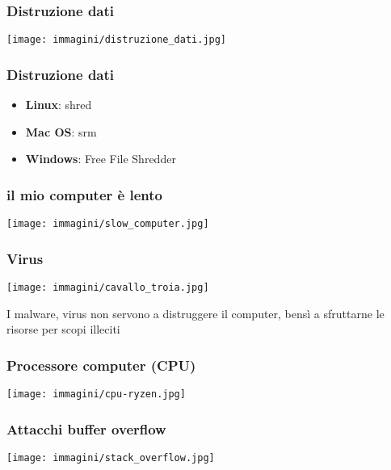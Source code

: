 \documentclass[italian,aspectratio=169]{beamer}
\begin{document}
\begin{frame}
 \frametitle{Distruzione dati}
   \vspace{-0.2cm}
    \begin{center}
     \texttt{[image: immagini/distruzione\_dati.jpg]}
    \end{center}
\end{frame}

\begin{frame}
 \frametitle{Distruzione dati}
 \begin{itemize}
  \item \textbf{Linux}: shred
  \item \textbf{Mac OS}: srm
  \item \textbf{Windows}: Free File Shredder
 \end{itemize}
\end{frame}

\begin{frame}
 \frametitle{il mio computer è lento}
 \begin{center}
   \texttt{[image: immagini/slow\_computer.jpg]}
  \end{center}
\end{frame}

\begin{frame}
 \frametitle{Virus}
  \begin{center}
   \texttt{[image: immagini/cavallo\_troia.jpg]}
  \end{center}
 
 I malware, virus non servono a distruggere il computer, bensì a sfruttarne le  risorse per scopi illeciti
\end{frame}


\begin{frame}
 \frametitle{Processore computer (CPU)}
 \begin{center}
   \texttt{[image: immagini/cpu-ryzen.jpg]}
  \end{center}
\end{frame}

{
\begin{frame}[plain]
\end{frame}
}

\begin{frame}
 \frametitle{Attacchi buffer overflow}
   \begin{center}
   \texttt{[image: immagini/stack\_overflow.jpg]}
  \end{center}
\end{frame}
\end{document}
